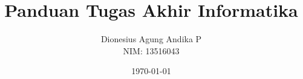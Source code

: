 \documentclass[12pt, a4paper, onecolumn, oneside, final]{report}
\begin{document}
    \title{Panduan Tugas Akhir Informatika}
    \date{\today}
    \author{
        Dionesius Agung Andika P \\
        NIM: 13516043
    }

    \setcounter{page}{0}

    
    
%    
    

    \pagestyle{plain}

    
    
    

    \renewcommand*\contentsname{DAFTAR ISI}
    \renewcommand*\appendixtocname{DAFTAR LAMPIRAN}
    \renewcommand*\listfigurename{DAFTAR GAMBAR}
    \renewcommand*\listtablename{DAFTAR TABEL}
    \renewcommand*\bibname{DAFTAR PUSTAKA}

    \tableofcontents
    \listofappendices
    {%
		\let\oldnumberline\numberline%
		\renewcommand{\numberline}{\figurename~\oldnumberline}%
		\listoffigures%
	}
	{%
		\let\oldnumberline\numberline%
		\renewcommand{\numberline}{\tablename~\oldnumberline}%
		\listoftables%
	}

    
    \renewcommand{\chaptername}{BAB}
    \renewcommand{\thechapter}{\Roman{chapter}}

    
    
    
    
    
\end{document}
